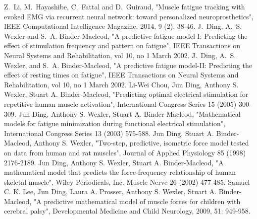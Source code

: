 \documentclass[10pt,twocolumn,letterpaper, 
]{article}
\begin{document}
\begin{thebibliography}{1}
\small{
Z.~Li, M.~Hayashibe, C.~Fattal and D.~Guiraud, "Muscle fatigue tracking with evoked EMG via recurrent neural network: toward personalized neuroprosthetics", IEEE Computational Intelligence Magazine, 2014, 9 (2), 38-46.
J.~Ding, A.~S. Wexler and S.~A. Binder-Macleod, "A predictive fatigue model-I: Predicting the effect of stimulation frequency and pattern on fatigue", IEEE Transactions on Neural Systems and Rehabilitation, vol 10, no 1 March 2002.
J.~Ding, A.~S. Wexler, and S.~A. Binder-Macleod, "A predictive fatigue model-II: Predicting the effect of resting times on fatigue", IEEE Transactions on Neural Systems and Rehabilitation, vol 10, no 1 March 2002.
Li-Wei Chou, Jun Ding, Anthony S. Wexler, Stuart A. Binder-Macleod, "Predicting optimal electrical stimulation for repetitive human muscle activation", International Congress Series 15 (2005) 300-309.
 Jun Ding, Anthony S. Wexler, Stuart A. Binder-Macleod, "Mathematical models for fatigue minimization during functional electrical stimulation", International Congress Series 13 (2003) 575-588.
Jun Ding, Stuart A. Binder-Macleod, Anthony S. Wexler, "Two-step, predictive, isometric force model tested on data from human and rat muscles", Journal of Applied Physiology 85 (1998) 2176-2189.
Jun Ding, Anthony S. Wexler, Stuart A. Binder-Macleod, "A mathematical model that predicts the force-frequency relationship of human skeletal muscle", Wiley Periodicals, Inc. Muscle Nerve 26 (2002) 477-485.
 Samuel C. K. Lee, Jun Ding, Laura A. Prosser, Anthony S. Wexler, Stuart A. Binder-Macleod, "A predictive mathematical model of muscle forces for children with cerebral palsy", Developmental Medicine and Child Neurology, 2009, 51: 949-958.
}
\end{thebibliography}

	

%
%
%
%
%
\end{document}

